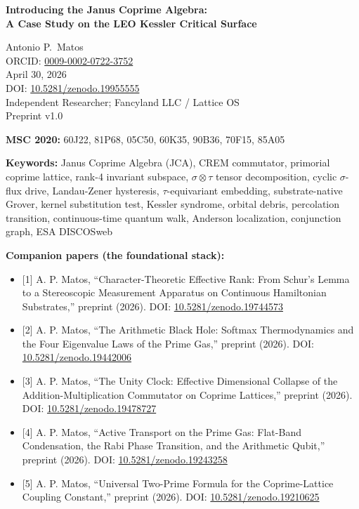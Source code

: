 \documentclass[
]{article}
\author{}
\date{}
\providecommand{\tightlist}{%
  \setlength{\itemsep}{0pt}\setlength{\parskip}{0pt}}
\begin{document}
\begin{center}
{\LARGE\bfseries Introducing the Janus Coprime Algebra:\\[0.4em]
A Case Study on the LEO Kessler Critical Surface}

\vspace{1.5em}

{\large Antonio P.\ Matos}\\[0.4em]
{\small ORCID: \href{https://orcid.org/0009-0002-0722-3752}{0009-0002-0722-3752}}\\[0.3em]
April 30, 2026\\[0.3em]
{\small DOI: \href{https://doi.org/10.5281/zenodo.19955555}{10.5281/zenodo.19955555}}\\[0.3em]
Independent Researcher; Fancyland LLC / Lattice OS\\[0.3em]
Preprint v1.0

\vspace{0.8em}

{\small\textbf{MSC 2020:} 60J22, 81P68, 05C50, 60K35, 90B36, 70F15, 85A05}

\vspace{0.4em}

{\small\textbf{Keywords:} Janus Coprime Algebra (JCA), CREM commutator, primorial coprime lattice, rank-4 invariant subspace, $\sigma\otimes\tau$ tensor decomposition, cyclic $\sigma$-flux drive, Landau-Zener hysteresis, $\tau$-equivariant embedding, substrate-native Grover, kernel substitution test, Kessler syndrome, orbital debris, percolation transition, continuous-time quantum walk, Anderson localization, conjunction graph, ESA DISCOSweb}
\end{center}

\textbf{Companion papers (the foundational stack):}

\begin{itemize}
\tightlist
\item
  {[}1{]} A. P. Matos, ``Character-Theoretic Effective Rank: From
  Schur's Lemma to a Stereoscopic Measurement Apparatus on Continuous
  Hamiltonian Substrates,'' preprint (2026). DOI:
  \href{https://doi.org/10.5281/zenodo.19744573}{10.5281/zenodo.19744573}
\item
  {[}2{]} A. P. Matos, ``The Arithmetic Black Hole: Softmax
  Thermodynamics and the Four Eigenvalue Laws of the Prime Gas,''
  preprint (2026). DOI:
  \href{https://doi.org/10.5281/zenodo.19442006}{10.5281/zenodo.19442006}
\item
  {[}3{]} A. P. Matos, ``The Unity Clock: Effective Dimensional Collapse
  of the Addition-Multiplication Commutator on Coprime Lattices,''
  preprint (2026). DOI:
  \href{https://doi.org/10.5281/zenodo.19478727}{10.5281/zenodo.19478727}
\item
  {[}4{]} A. P. Matos, ``Active Transport on the Prime Gas: Flat-Band
  Condensation, the Rabi Phase Transition, and the Arithmetic Qubit,''
  preprint (2026). DOI:
  \href{https://doi.org/10.5281/zenodo.19243258}{10.5281/zenodo.19243258}
\item
  {[}5{]} A. P. Matos, ``Universal Two-Prime Formula for the
  Coprime-Lattice Coupling Constant,'' preprint (2026). DOI:
  \href{https://doi.org/10.5281/zenodo.19210625}{10.5281/zenodo.19210625}
\end{itemize}
\end{document}
